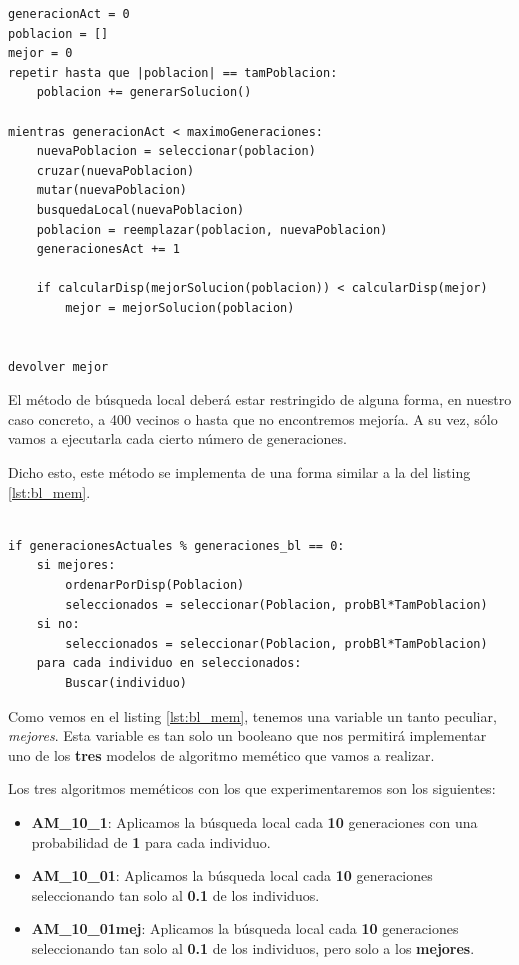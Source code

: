 \begin{lstlisting}[frame=single, caption={Algoritmo memético}, captionpos=b, label=lst:memetico]
generacionAct = 0
poblacion = []
mejor = 0
repetir hasta que |poblacion| == tamPoblacion:
    poblacion += generarSolucion()

mientras generacionAct < maximoGeneraciones:
    nuevaPoblacion = seleccionar(poblacion)
    cruzar(nuevaPoblacion)
    mutar(nuevaPoblacion)
    busquedaLocal(nuevaPoblacion)
    poblacion = reemplazar(poblacion, nuevaPoblacion)
    generacionesAct += 1
    
    if calcularDisp(mejorSolucion(poblacion)) < calcularDisp(mejor)
        mejor = mejorSolucion(poblacion)
    

devolver mejor
\end{lstlisting}

El método de búsqueda local deberá estar restringido de alguna forma, en nuestro caso concreto, a 400 vecinos o hasta que no encontremos mejoría. A su vez, sólo vamos a ejecutarla cada cierto número de generaciones.

Dicho esto, este método se implementa de una forma similar a la del listing \ref{lst:bl_mem}.

\begin{lstlisting}[frame=single, caption={Búsqueda local en algoritmos meméticos}, captionpos=b, label=lst:bl_mem]

if generacionesActuales % generaciones_bl == 0:
    si mejores:
        ordenarPorDisp(Poblacion)
        seleccionados = seleccionar(Poblacion, probBl*TamPoblacion)
    si no:
        seleccionados = seleccionar(Poblacion, probBl*TamPoblacion)
    para cada individuo en seleccionados:
        Buscar(individuo)

\end{lstlisting}

Como vemos en el listing \ref{lst:bl_mem}, tenemos una variable un tanto peculiar, \textit{mejores}. Esta variable es tan solo un booleano que nos permitirá implementar uno de los \textbf{tres} modelos de algoritmo memético que vamos a realizar.

Los tres algoritmos meméticos con los que experimentaremos son los siguientes:

\begin{itemize}
\item \textbf{AM\_10\_1}: Aplicamos la búsqueda local cada \textbf{10} generaciones con una probabilidad de \textbf{1} para cada individuo.
\item \textbf{AM\_10\_01}: Aplicamos la búsqueda local cada \textbf{10} generaciones seleccionando tan solo al \textbf{0.1} de los individuos.
\item \textbf{AM\_10\_01mej}: Aplicamos la búsqueda local cada \textbf{10} generaciones seleccionando tan solo al \textbf{0.1} de los individuos, pero solo a los \textbf{mejores}.
\end{itemize}

